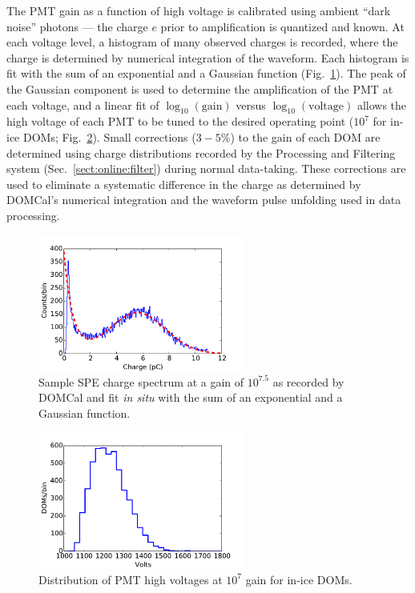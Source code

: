 The PMT gain as a function of high voltage is calibrated using ambient
``dark noise'' photons --- the charge $e$ prior to amplification is quantized
and known.  At each voltage level, a histogram of many observed charges is
recorded, where the charge is determined by numerical integration of the waveform.
Each histogram is fit with the sum of an exponential and a Gaussian
function (Fig.~\ref{fig:domcal_hvfit}).  The peak of the Gaussian component is used
to 
determine the amplification of the PMT at each voltage, and a linear fit
of $\log_{10}(\mathrm{gain})$ versus $\log_{10}(\mathrm{voltage})$ allows
the high voltage of each PMT to be tuned to the desired operating point ($10^7$
for in-ice DOMs; Fig.~\ref{fig:domcal_hv_settings}).  Small 
corrections ($3-5\%$) to the gain of each DOM are determined using charge
distributions recorded by the Processing and Filtering system
(Sec.~\ref{sect:online:filter}) during normal data-taking.  These
corrections are used to eliminate a systematic difference in the charge as
determined by DOMCal's numerical integration and the waveform pulse
unfolding used in data processing. 

\begin{figure}[!h]
 \centering
 \includegraphics[width=0.6\textwidth]{graphics/dom/domcal/hvfit.pdf}
 \caption{Sample SPE charge spectrum at a gain of $10^{7.5}$ as recorded by DOMCal and fit
   \textit{in situ} with the sum of an exponential and a Gaussian function.}
 \label{fig:domcal_hvfit}
\end{figure}

\begin{figure}[!h]
 \centering
 \includegraphics[width=0.6\textwidth]{graphics/dom/domcal/inice_hv_2016.pdf}
 \caption{Distribution of PMT high voltages at $10^7$ gain for in-ice DOMs.}
 \label{fig:domcal_hv_settings}
\end{figure}

